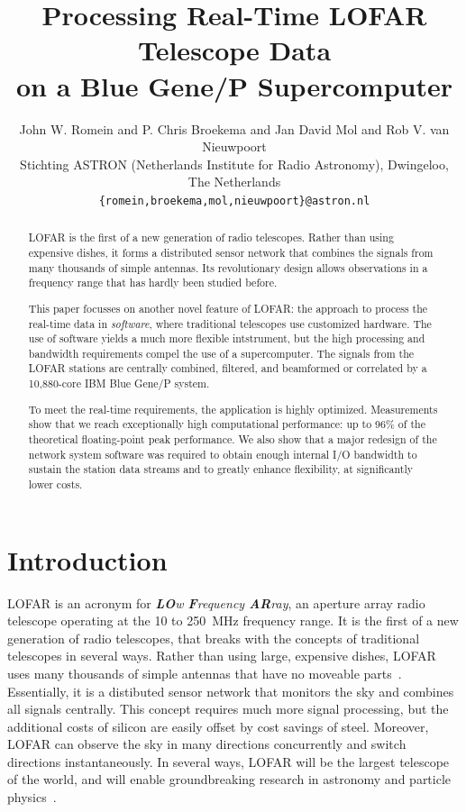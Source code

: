 \documentclass[conference]{IEEEtran}
\begin{document}
\title{Processing Real-Time LOFAR Telescope Data \\ on a Blue Gene/P Supercomputer}
\author{John W. Romein and P. Chris Broekema and Jan David Mol and Rob V. van Nieuwpoort\\
Stichting ASTRON (Netherlands Institute for Radio Astronomy), Dwingeloo, The Netherlands\\
\small{\texttt{\{romein,broekema,mol,nieuwpoort\}@astron.nl}}}

\maketitle


\begin{abstract}
LOFAR is the first of a new generation of radio telescopes.
Rather than using expensive dishes, it forms a distributed sensor network that
combines the signals from many thousands of simple antennas.
Its revolutionary design allows observations in a frequency range that has
hardly been studied before.

This paper focusses on another novel feature of LOFAR: the approach to
process the real-time data in \emph{software}, where traditional telescopes
use customized hardware.
The use of software yields a much more flexible intstrument, but the high
processing and bandwidth requirements compel the use of a supercomputer.
The signals from the LOFAR stations are centrally combined, filtered, and
beamformed or correlated by a 10,880-core IBM Blue Gene/P system.

To meet the real-time requirements, the application is highly optimized.
Measurements show that we reach exceptionally high computational performance:
up to 96\% of the theoretical floating-point peak performance.
We also show that a major redesign of the network system software was
required to obtain enough internal I/O bandwidth to sustain the station data
streams and to greatly enhance flexibility, at significantly lower costs.
\end{abstract}


\section{Introduction}
LOFAR is an acronym for \emph{\textbf{LO}w \textbf{F}requency \textbf{AR}ray},
an aperture array radio telescope operating at the 10 to 250~MHz frequency
range.
It is the first of a new generation of radio telescopes, that breaks with
the concepts of traditional telescopes in several ways.
Rather than using large, expensive dishes, LOFAR uses many thousands of
simple antennas that have no moveable parts~\cite{Butcher:04,deVos:09}.
Essentially, it is a distibuted sensor network that monitors the sky
and combines all signals centrally.
This concept requires much more signal processing, but the additional costs
of silicon are easily offset by cost savings of steel.
Moreover, LOFAR can observe the sky in many directions concurrently and
switch directions instantaneously.
In several ways, LOFAR will be the largest telescope of the world, and will
enable groundbreaking research in astronomy and particle
physics~\cite{Bruyn:02}.
\end{document}

